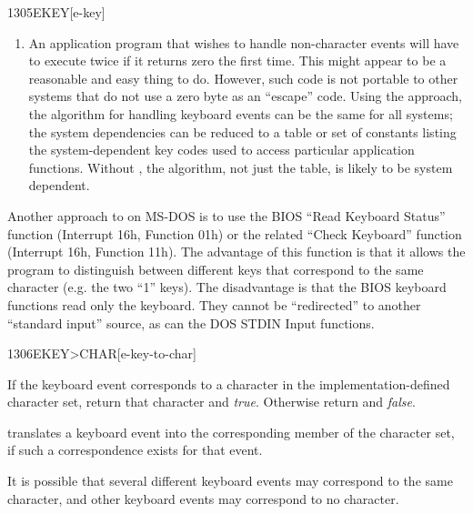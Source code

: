 \begin{worddef}{1305}{EKEY}[e-key]
\begin{defer}
\begin{enumerate}
		\item An application program that wishes to handle non-character
			events will have to execute  twice if it
			returns zero the first time. This might appear to be a
			reasonable and easy thing to do. However, such code is not
			portable to other systems that do not use a zero byte as an
			``escape'' code. Using the  approach, the
			algorithm for handling keyboard events can be the same for
			all systems; the system dependencies can be reduced to a
			table or set of constants listing the system-dependent key
			codes used to access particular application functions.
			Without , the algorithm, not just the table, is
			likely to be system dependent.
		\end{enumerate}

		Another approach to  on MS-DOS is to use the BIOS
		``Read Keyboard Status'' function (Interrupt 16h, Function 01h)
		or the related ``Check Keyboard'' function (Interrupt 16h,
		Function 11h). The advantage of this function is that it allows
		the program to distinguish between different keys that correspond
		to the same character (e.g. the two ``1'' keys). The disadvantage
		is that the BIOS keyboard functions read only the keyboard. They
		cannot be ``redirected'' to another ``standard input'' source,
		as can the DOS STDIN Input functions.
	\end{defer}
\end{worddef}


\begin{worddef}[EKEYtoCHAR]{1306}{EKEY>CHAR}[e-key-to-char]
\item {}

	If the keyboard event  corresponds to a character in the
	implementation-defined character set, return that character and
	\emph{true}. Otherwise return  and \emph{false}.

	\begin{defer}
	\rationale %
		 translates a keyboard event into the
		corresponding member of the character set, if such a
		correspondence exists for that event.

		It is possible that several different keyboard events may
		correspond to the same character, and other keyboard events
		may correspond to no character.
	\end{defer}
\end{worddef}




